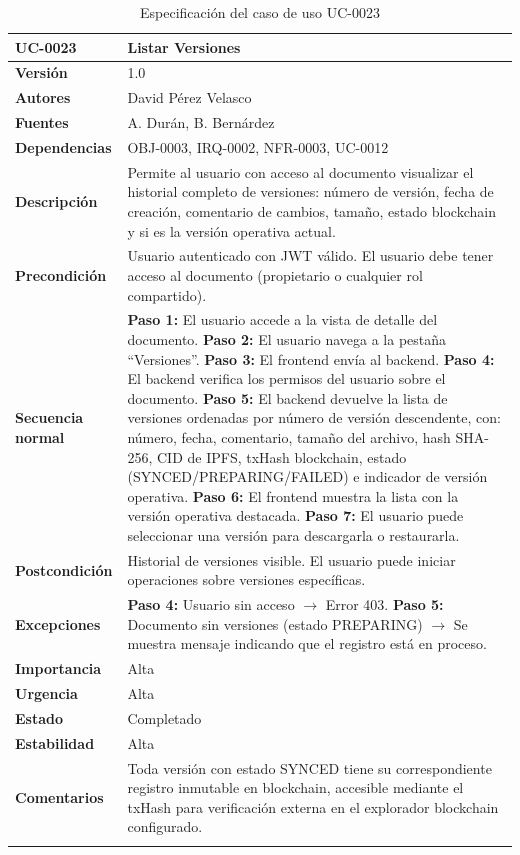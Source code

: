 \documentclass[11pt, a4paper]{article}
\begin{document}
\begin{longtable}{|p{4cm}|p{10cm}|}
\hline
\textbf{UC-0023} & Listar Versiones \\
\hline
\textbf{Versión} & 1.0 \\
\hline
\textbf{Autores} & David Pérez Velasco \\
\hline
\textbf{Fuentes} & A. Durán, B. Bernárdez \\
\hline
\textbf{Dependencias} & OBJ-0003, IRQ-0002, NFR-0003, UC-0012 \\
\hline
\textbf{Descripción} & Permite al usuario con acceso al documento visualizar el historial completo de versiones: número de versión, fecha de creación, comentario de cambios, tamaño, estado blockchain y si es la versión operativa actual. \\
\hline
\textbf{Precondición} & Usuario autenticado con JWT válido. El usuario debe tener acceso al documento (propietario o cualquier rol compartido). \\
\hline
\textbf{Secuencia normal} &
\textbf{Paso 1:} El usuario accede a la vista de detalle del documento.\newline
\textbf{Paso 2:} El usuario navega a la pestaña ``Versiones''.\newline
\textbf{Paso 3:} El frontend envía al backend.\newline
\textbf{Paso 4:} El backend verifica los permisos del usuario sobre el documento.\newline
\textbf{Paso 5:} El backend devuelve la lista de versiones ordenadas por número de versión descendente, con: número, fecha, comentario, tamaño del archivo, hash SHA-256, CID de IPFS, txHash blockchain, estado (SYNCED/PREPARING/FAILED) e indicador de versión operativa.\newline
\textbf{Paso 6:} El frontend muestra la lista con la versión operativa destacada.\newline
\textbf{Paso 7:} El usuario puede seleccionar una versión para descargarla o restaurarla.\\
\hline
\textbf{Postcondición} & Historial de versiones visible. El usuario puede iniciar operaciones sobre versiones específicas. \\
\hline
\textbf{Excepciones} &
\textbf{Paso 4:} Usuario sin acceso $\rightarrow$ Error 403.\newline
\textbf{Paso 5:} Documento sin versiones (estado PREPARING) $\rightarrow$ Se muestra mensaje indicando que el registro está en proceso.\\
\hline
\textbf{Importancia} & Alta \\
\hline
\textbf{Urgencia} & Alta \\
\hline
\textbf{Estado} & Completado \\
\hline
\textbf{Estabilidad} & Alta \\
\hline
\textbf{Comentarios} & Toda versión con estado SYNCED tiene su correspondiente registro inmutable en blockchain, accesible mediante el txHash para verificación externa en el explorador blockchain configurado. \\
\hline
\caption{Especificación del caso de uso UC-0023}
\end{longtable}
\end{document}
